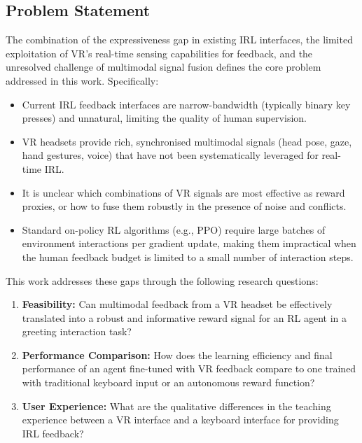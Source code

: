 \documentclass[../report.tex]{subfiles}
\begin{document}
    \subsection{Problem Statement}
    \label{sec:introduction:problem_statement}

    The combination of the expressiveness gap in existing IRL interfaces, the limited exploitation of VR's real-time sensing capabilities for feedback, and the unresolved challenge of multimodal signal fusion defines the core problem addressed in this work. Specifically:

    \begin{itemize}
        \item Current IRL feedback interfaces are narrow-bandwidth (typically binary key presses) and unnatural, limiting the quality of human supervision.
        \item VR headsets provide rich, synchronised multimodal signals (head pose, gaze, hand gestures, voice) that have not been systematically leveraged for real-time IRL.
        \item It is unclear which combinations of VR signals are most effective as reward proxies, or how to fuse them robustly in the presence of noise and conflicts.
        \item Standard on-policy RL algorithms (e.g., PPO) require large batches of environment interactions per gradient update, making them impractical when the human feedback budget is limited to a small number of interaction steps.
    \end{itemize}

    This work addresses these gaps through the following research questions:
    \begin{enumerate}
        \item \textbf{Feasibility:} Can multimodal feedback from a VR headset be effectively translated into a robust and informative reward signal for an RL agent in a greeting interaction task?
        \item \textbf{Performance Comparison:} How does the learning efficiency and final performance of an agent fine-tuned with VR feedback compare to one trained with traditional keyboard input or an autonomous reward function?
        \item \textbf{User Experience:} What are the qualitative differences in the teaching experience between a VR interface and a keyboard interface for providing IRL feedback?
    \end{enumerate}
\end{document}
